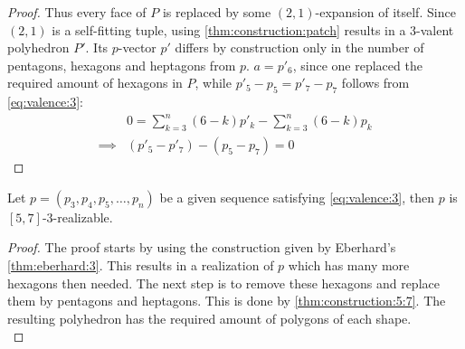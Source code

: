 \begin{construction}
\begin{proof}
    Thus every face of $P$ is replaced by some $(2, 1)$-expansion of itself. Since $(2, 1)$ is a self-fitting tuple, using \autoref{thm:construction:patch} results in a $3$-valent polyhedron $P'$. Its $p$-vector $p'$ differs by construction only in the number of pentagons, hexagons and heptagons from $p$. $a = p'_6$, since one replaced the required amount of hexagons in $P$, while $p'_5 - p_5 = p'_7 - p_7$ follows from \autoref{eq:valence:3}:
    \begin{align*}
      &0 = \sum_{k=3}^n \left(6 - k \right) p'_k - \sum_{k=3}^n \left(6 - k \right) p_k \\
      \implies & (p'_5 - p'_7) - (p_5 -p_7) = 0
    \end{align*}
  \end{proof}
\end{construction}

\begin{corollary}
  Let $p = (p_3, p_4, p_5, \dots, p_n)$ be a given sequence satisfying \autoref{eq:valence:3}, then $p$ is $[5, 7]$-$3$-realizable.
  \begin{proof}
    The proof starts by using the construction given by Eberhard's \autoref{thm:eberhard:3}. This results in a realization of $p$ which has many more hexagons then needed. The next step is to remove these hexagons and replace them by pentagons and heptagons. This is done by \autoref{thm:construction:5:7}. The resulting polyhedron has the required amount of polygons of each shape.\\
  \end{proof}
\end{corollary}
